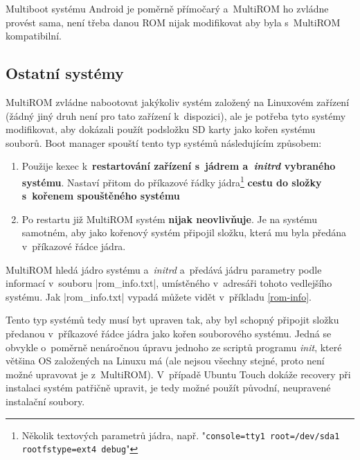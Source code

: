 \documentclass[12pt, a4paper, oneside]{article}
\newcommand{\B}{\textbf} %
\newcommand{\It}{\textit}  %
\begin{document}
Multiboot systému Android je poměrně přímočarý a~MultiROM ho zvládne provést sama, není třeba danou ROM nijak modifikovat aby byla s~MultiROM kompatibilní.

\subsection{Ostatní systémy}
MultiROM zvládne nabootovat jakýkoliv systém založený na Linuxovém zařízení (žádný jiný druh není pro tato zařízení k~dispozici), ale je potřeba tyto systémy modifikovat, aby dokázali použít podsložku SD karty jako kořen systému souborů. Boot manager spouští tento typ systémů následujícím způsobem:
\begin{enumerate}
    \item Použije kexec k~\B{restartování zařízení s~jádrem a~\It{initrd} vybraného systému}. Nastaví přitom do příkazové řádky jádra\footnote{Několik textových parametrů jádra, např. "\verb-console=tty1 root=/dev/sda1 rootfstype=ext4 debug-"} \B{cestu do složky s~kořenem spouštěného systému}
    \item Po restartu již MultiROM systém \B{nijak neovlivňuje}. Je na systému samotném, aby jako kořenový systém připojil složku, která mu byla předána v~příkazové řádce jádra.
\end{enumerate}

MultiROM hledá jádro systému a~\It{initrd} a~předává jádru parametry podle informací v~souboru |rom_info.txt|, umístěného v~adresáři tohoto vedlejšího systému. Jak |rom_info.txt| vypadá můžete vidět v~příkladu \ref{rom-info}.

Tento typ systémů tedy musí byt upraven tak, aby byl schopný připojit složku předanou v~příkazové řádce jádra jako kořen souborového systému. Jedná se obvykle o~poměrně nenáročnou úpravu jednoho ze scriptů programu \It{init}, které většina OS založených na Linuxu má (ale nejsou všechny stejné, proto není možné upravovat je z~MultiROM). V~případě Ubuntu Touch dokáže recovery při instalaci systém patřičně upravit, je tedy možné použít původní, neupravené instalační soubory.
\end{document}
